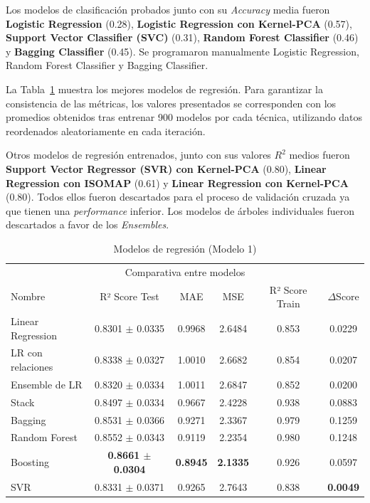 \documentclass{article}
\begin{document}
Los modelos de clasificación probados junto con su \textit{Accuracy} media fueron \textbf{Logistic Regression} (0.28), \textbf{Logistic Regression con Kernel-PCA} (0.57), \textbf{Support Vector Classifier (SVC)} (0.31), \textbf{Random Forest Classifier} (0.46) y  \textbf{Bagging Classifier} (0.45). 
Se programaron manualmente Logistic Regression, Random Forest Classifier y  Bagging Classifier.

La Tabla~\ref{table-M1} muestra los mejores modelos de regresión. Para garantizar la consistencia de las métricas, los valores presentados se corresponden con los promedios obtenidos tras entrenar 900 modelos por cada técnica, utilizando datos reordenados aleatoriamente en cada iteración.

Otros modelos de regresión entrenados, junto con sus valores \textit{$R^2$} medios fueron \textbf{Support Vector Regressor (SVR) con Kernel-PCA} (0.80), \textbf{Linear Regression con ISOMAP} (0.61) y \textbf{Linear Regression con Kernel-PCA} (0.80). Todos ellos fueron descartados para el proceso de validación cruzada ya que tienen una \textit{performance} inferior.
Los modelos de árboles individuales fueron descartados a favor de los \textit{Ensembles}.

\begin{table}[H]
  \caption{Modelos de regresión (Modelo 1)}
  \label{table-M1}
  \centering
  \begin{tabular}{lccccc}
    \toprule
    \multicolumn{6}{c}{Comparativa entre modelos} \\
    \cmidrule(r){1-6}
    Nombre & R² Score Test & MAE & MSE & R² Score Train & $\Delta$Score \\
    \midrule
    Linear Regression & 0.8301 $\pm$ 0.0335 & 0.9968 & 2.6484 & 0.853 & 0.0229\\
    LR con relaciones & 0.8338 $\pm$ 0.0327 & 1.0010 & 2.6682 & 0.854 & 0.0207 \\
    Ensemble de LR    & 0.8320 $\pm$ 0.0334 & 1.0011 & 2.6847 & 0.852 & 0.0200\\
    Stack             & 0.8497 $\pm$ 0.0334 & 0.9667 & 2.4228 & 0.938 & 0.0883\\
    Bagging           & 0.8531 $\pm$ 0.0366 & 0.9271 & 2.3367 & 0.979 & 0.1259\\
    Random Forest     & 0.8552 $\pm$ 0.0343 & 0.9119 & 2.2354 & 0.980 & 0.1248\\
    Boosting     & \textbf{0.8661 $\pm$ 0.0304} & \textbf{0.8945} & \textbf{2.1335} & 0.926 & 0.0597\\
    SVR               & 0.8331 $\pm$ 0.0371 & 0.9265 & 2.7643 & 0.838 & \textbf{0.0049}\\
    \bottomrule
  \end{tabular}
\end{table}
\end{document}

